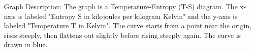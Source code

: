 Graph Description: The graph is a Temperature-Entropy (T-S) diagram. The x-axis is labeled "Entropy S in kilojoules per kilogram Kelvin" and the y-axis is labeled "Temperature T in Kelvin". The curve starts from a point near the origin, rises steeply, then flattens out slightly before rising steeply again. The curve is drawn in blue.